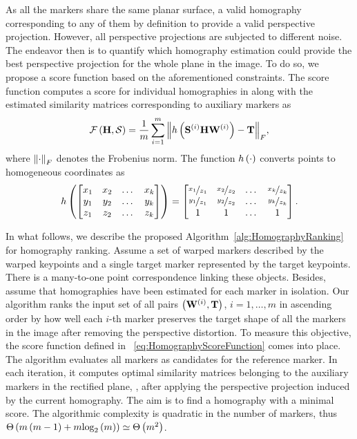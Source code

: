 As all the markers share the same planar surface, a valid homography corresponding to any of them by definition to provide a valid perspective projection. However, all perspective projections are subjected to different noise. The endeavor then is to quantify which homography estimation could provide the best perspective projection for the whole plane in the image. To do so, we propose a score function based on the aforementioned constraints. The score function computes a score for individual homographies in along with the estimated similarity matrices corresponding to auxiliary markers as
\begin{equation}
    \label{eq:HomographyScoreFunction}
    {\mathcal{F}} \left( \mathbf{H}, \mathcal{S} \right) =
    \frac{1}{m}
    \sum_{i = 1}^{m}
    {\left\Vert {
        {h} \left( 
            {\mathbf{S}}^{\left( {i} \right)}
            \mathbf{H}{\mathbf{W}}^{\left( {i} \right)}
         \right)
        -
        \mathbf{T}
    } \right\Vert}_F,
\end{equation}
where ${\left\Vert {\cdot} \right\Vert}_F$ denotes the Frobenius norm. The function ${h} \left( \cdot \right)$ converts points to homogeneous coordinates as
\begin{equation}
    \label{eq:HomoCoordsConversion}
    {h} \left( 
        \begin{bmatrix}
            x_1 & x_2 & \dots & x_k \\
            y_1 & y_2 & \dots & y_k \\
            z_1 & z_2 & \dots & z_k
        \end{bmatrix}
     \right) =
    \begin{bmatrix}
        \nicefrac{x_1}{z_1} & \nicefrac{x_2}{z_2} & \dots & \nicefrac{x_k}{z_k} \\
        \nicefrac{y_1}{z_1} & \nicefrac{y_2}{z_2} & \dots & \nicefrac{y_k}{z_k} \\
        1                   & 1                   & \dots & 1
    \end{bmatrix}.
\end{equation}

In what follows, we describe the proposed Algorithm~\ref{alg:HomographyRanking} for homography ranking. Assume a set of warped markers described by the warped keypoints and a single target marker represented by the target keypoints. There is a many-to-one point correspondence linking these objects. Besides, assume that homographies have been estimated for each marker in isolation. Our algorithm ranks the input set of all pairs $\left( {{\mathbf{W}}^{\left( {i} \right)}, \mathbf{T}} \right)$, $i = 1, \dots, m$ in ascending order by how well each $i$-th marker preserves the target shape of all the markers in the image after removing the perspective distortion. To measure this objective, the score function defined in \eqtext{}~\ref{eq:HomographyScoreFunction} comes into place. The algorithm evaluates all markers as candidates for the reference marker. In each iteration, it computes optimal similarity matrices belonging to the auxiliary markers in the rectified plane, \ietext{}, after applying the perspective projection induced by the current homography. The aim is to find a homography with a minimal score. The algorithmic complexity is quadratic in the number of markers, thus ${\Theta} \left( m \left( {m - 1} \right) + m {\text{log}_2} \left( m \right) \right) \simeq {\Theta} \left( m^2 \right)$.

